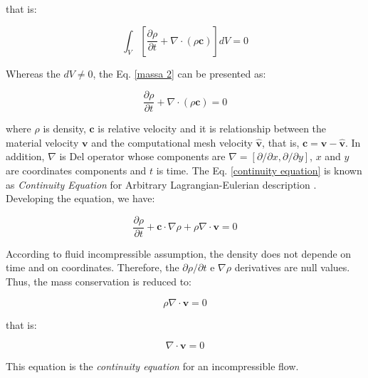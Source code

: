 \medskip
\noindent
that is:

\begin{equation} \label{massa 2}
 \int_{V} \left[ \frac{\partial \rho}{\partial t}
 + 
 \nabla \cdot 
\left( \rho \textbf{c} \right) 
\right] dV 
 = 0 
\end{equation}

\medskip
\noindent 
Whereas the $dV \neq 0$,
the Eq. \ref{massa 2} can be presented as:

\begin{equation} \label{continuity equation}
 \frac{\partial \rho}{\partial t}
 + 
 \nabla \cdot 
\left( \rho \textbf{c} \right) 
 = 0 
\end{equation}

\medskip
\noindent 
where $\rho$ is density, 
$\textbf{c}$ is relative velocity and
it is relationship between the
material velocity $\textbf{v}$ and
the computational mesh velocity $\hat{\textbf{v}}$,
that is, $\textbf{c} = \textbf{v} - \hat{\textbf{v}}$.
In addition, $\nabla$ is Del operator whose components are 
$\nabla = \left[ \partial/\partial x, \partial / \partial y \right]$,
$x$ and $y$ are coordinates components and
$t$ is time.
The Eq. \ref{continuity equation} is known
as \textit{Continuity Equation} 
for Arbitrary Lagrangian-Eulerian description \cite{donea1982}.
Developing the equation, we have:

\begin{equation}
 \frac{\partial \rho}{\partial t}
 +
 \textbf{c} \cdot \nabla \rho
 +
 \rho \nabla \cdot \textbf{v}
 = 0
\end{equation}

\medskip
According to fluid incompressible assumption,
the density does not depende on time and on coordinates.
Therefore, the 
$\partial \rho / \partial t$ e $\nabla \rho$ derivatives are 
null values.
Thus, the mass conservation is reduced to:

\begin{equation} \label{massa 3}
 \rho \nabla \cdot \textbf{v}
 = 0 
\end{equation}

\medskip
\noindent that is:

\begin{equation} \label{incompressible continuity equation}
 \nabla \cdot \textbf{v}
 = 0 
\end{equation}

\medskip
\noindent This equation is the \textit{continuity equation} for an incompressible flow.


\newpage



